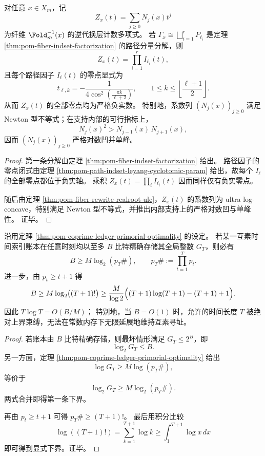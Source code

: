 \begin{theorem}\label{thm:xi-time-part9k-fold-fiber-layer-count-realroot-logconcavity}
对任意 \(x\in X_m\)，记
\[
Z_x(t)=\sum_{j\ge 0}N_j(x)t^j
\]
为纤维 \(\Fold_m^{-1}(x)\) 的逆代换层计数多项式。
若 \(\Gamma_x\cong\bigsqcup_{i=1}^{r}P_{\ell_i}\) 是定理 \ref{thm:pom-fiber-indset-factorization} 的路径分量分解，则
\[
Z_x(t)=\prod_{i=1}^{r}I_{\ell_i}(t),
\]
且每个路径因子 \(I_{\ell}(t)\) 的零点显式为
\[
t_{\ell,k}=-\frac{1}{4\cos^2\!\left(\frac{\pi k}{\ell+2}\right)},
\qquad
1\le k\le \left\lfloor\frac{\ell+1}{2}\right\rfloor.
\]
从而 \(Z_x(t)\) 的全部零点均为严格负实数。
特别地，系数列 \((N_j(x))_{j\ge 0}\) 满足 Newton 型不等式；在支持内部的可行指标上，
\[
N_j(x)^2> N_{j-1}(x)\,N_{j+1}(x),
\]
因而 \((N_j(x))_{j\ge 0}\) 严格对数凹并单峰。
\end{theorem}
\begin{proof}
第一条分解由定理 \ref{thm:pom-fiber-indset-factorization} 给出。
路径因子的零点闭式由定理 \ref{thm:pom-path-indset-leyang-cyclotomic-param} 给出，故每个 \(I_{\ell}\) 的全部零点都位于负实轴。
乘积 \(Z_x(t)=\prod_i I_{\ell_i}(t)\) 因而同样仅有负实零点。

随后由定理 \ref{thm:pom-fiber-rewrite-realroot-ulc}，\(Z_x(t)\) 的系数列为 ultra log-concave，特别满足 Newton 型不等式，并推出内部支持上的严格对数凹与单峰性。
证毕。
\end{proof}

\begin{theorem}[互素寻址的常数内存视界]\label{thm:xi-time-part9k-coprime-ledger-memory-horizon}
沿用定理 \ref{thm:pom-coprime-ledger-primorial-optimality} 的设定。
若某一互素时间索引账本在任意时刻均以至多 \(B\) 比特精确存储其全局整数 \(G_T\)，则必有
\[
B\ge M\log_2(p_T\#),
\qquad
p_T\#:=\prod_{t=1}^{T}p_t.
\]
进一步，由 \(p_t\ge t+1\) 得
\[
B\ge M\log_2\bigl((T+1)!\bigr)
\ge
\frac{M}{\log 2}\Bigl((T+1)\log(T+1)-(T+1)+1\Bigr).
\]
因此 \(T\log T=O(B/M)\)；
特别地，当 \(B=O(1)\) 时，允许的时间长度 \(T\) 被绝对上界束缚，无法在常数内存下无限延展地维持互素寻址。
\end{theorem}
\begin{proof}
若账本由 \(B\) 比特精确存储，则最坏情形满足 \(G_T\le 2^B\)，即
\[
\log_2 G_T\le B.
\]
另一方面，定理 \ref{thm:pom-coprime-ledger-primorial-optimality} 给出
\[
\log G_T\ge M\log(p_T\#),
\]
等价于
\[
\log_2 G_T\ge M\log_2(p_T\#).
\]
两式合并即得第一条下界。

再由 \(p_t\ge t+1\) 可得
\(
p_T\#\ge (T+1)!
\)。
最后用积分比较
\[
\log((T+1)!)=\sum_{k=1}^{T+1}\log k
\ge
\int_{1}^{T+1}\log x\,dx
\]
即可得到显式下界。证毕。
\end{proof}

